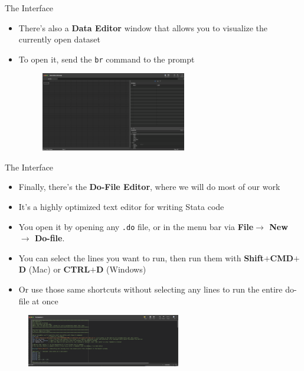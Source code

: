 \documentclass[11pt,notes=hide,aspectratio=169,mathserif]{beamer}
\begin{document}
\begin{frame}{The Interface}
    \begin{itemize}
    \item There's also a \textbf{Data Editor} window that allows you to visualize the currently open dataset 
    \item To open it, send the \texttt{br} command to the prompt
        \begin{figure}
            \centering
            \includegraphics[width=0.6\textwidth]{inputs/ta1_stata_data.png}
        \end{figure}
    \end{itemize}
\end{frame}

\begin{frame}{The Interface}
    \begin{itemize}
    \item Finally, there's the \textbf{Do-File Editor}, where we will do most of our work
    \item It's a highly optimized text editor for writing Stata code
    \item You open it by opening any \texttt{.do} file, or in the menu bar via \textbf{File$\rightarrow$ New $\rightarrow$ Do-file}.
    \item You can select the lines you want to run, then run them with \textbf{Shift$+$CMD$+$D} (Mac) or \textbf{CTRL$+$D} (Windows)
    \item Or use those same shortcuts without selecting any lines to run the entire do-file at once
    \end{itemize}
    \begin{figure}
        \centering
        \includegraphics[width=0.6\textwidth]{inputs/ta1_stata_do.png}
    \end{figure}
\end{frame}
\end{document}

